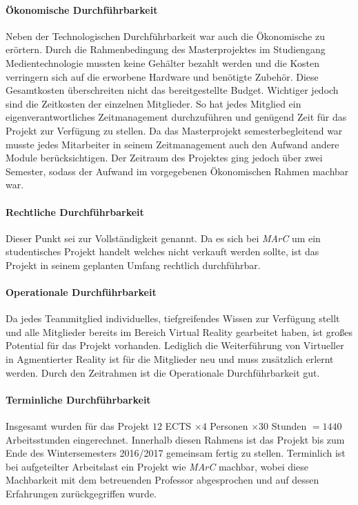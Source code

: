 \paragraph{Ökonomische Durchführbarkeit} Neben der Technologischen Durchführbarkeit war auch die Ökonomische zu erörtern. Durch die Rahmenbedingung des Masterprojektes im Studiengang Medientechnologie mussten keine Gehälter bezahlt werden und die Kosten verringern sich auf die erworbene Hardware und benötigte Zubehör. Diese Gesamtkosten überschreiten nicht das bereitgestellte Budget. Wichtiger jedoch sind die Zeitkosten der einzelnen Mitglieder. So hat jedes Mitglied ein eigenverantwortliches Zeitmanagement durchzuführen und genügend Zeit für das Projekt zur Verfügung zu stellen. Da das Masterprojekt semesterbegleitend war musste jedes Mitarbeiter in seinem Zeitmanagement auch den Aufwand andere Module berücksichtigen. Der Zeitraum des Projektes ging jedoch über zwei Semester, sodass der Aufwand im vorgegebenen Ökonomischen Rahmen machbar war.

\paragraph{Rechtliche Durchführbarkeit} Dieser Punkt sei zur Vollständigkeit genannt. Da es sich bei \textit{MArC} um ein studentisches Projekt handelt welches nicht verkauft werden sollte, ist das Projekt in seinem geplanten Umfang rechtlich durchführbar.

\paragraph{Operationale Durchführbarkeit} Da jedes Teammitglied individuelles, tiefgreifendes Wissen zur Verfügung stellt und alle Mitglieder bereits im Bereich Virtual Reality gearbeitet haben, ist großes Potential für das Projekt vorhanden. Lediglich die Weiterführung von Virtueller in Agmentierter Reality ist für die Mitglieder neu und muss zusätzlich erlernt werden. Durch den Zeitrahmen ist die Operationale Durchführbarkeit gut.


\paragraph{Terminliche Durchführbarkeit} Insgesamt wurden für das Projekt $12$ ECTS $\times 4$ Personen $\times 30$ Stunden $= 1440$ Arbeitsstunden eingerechnet. Innerhalb diesen Rahmens ist das Projekt bis zum Ende des Wintersemesters 2016/2017 gemeinsam fertig zu stellen. Terminlich ist bei aufgeteilter Arbeitslast ein Projekt wie \textit{MArC} machbar, wobei diese Machbarkeit mit dem betreuenden Professor abgesprochen und auf dessen Erfahrungen zurückgegriffen wurde.

